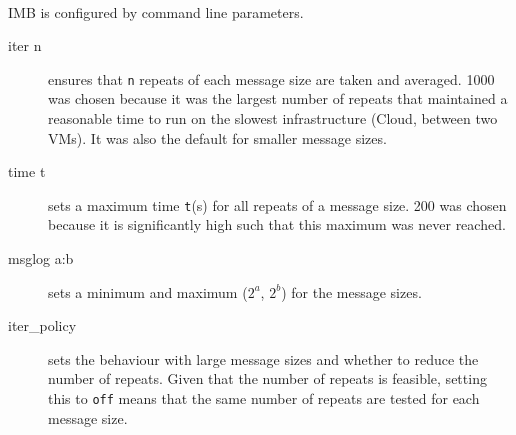 \documentclass{article}
\begin{document}
        \paragraph{}
        IMB is configured by command line parameters.

        \begin{description}
            \item[iter n] ensures that \verb|n| repeats of each message size are taken and averaged. 1000 was chosen because it was the largest number of repeats that maintained a reasonable time to run on the slowest infrastructure (Cloud, between two VMs). It was also the default for smaller message sizes.
            \item[time t] sets a maximum time \verb|t|(s) for all repeats of a message size. 200 was chosen because it is significantly high such that this maximum was never reached.
            \item[msglog a:b] sets a minimum and maximum ($2^{a}$, $2^{b}$) for the message sizes.
            \item[iter\_policy] sets the behaviour with large message sizes and whether to reduce the number of repeats. Given that the number of repeats is feasible, setting this to \verb|off| means that the same number of repeats are tested for each message size.
        \end{description}
\end{document}
